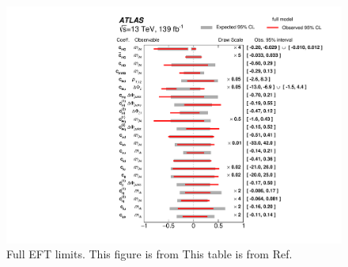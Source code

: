 \begin{figure}
    \centering
    \includegraphics[width=\mediumfigwidth]{Figures/m4l/Interpretations/EFTLimits_MVozak.pdf}
    \caption{Full EFT limits. This figure is from This table is from Ref.~\cite{m4l2021_paper}}
    \label{fig:EFTfull}
\end{figure}




